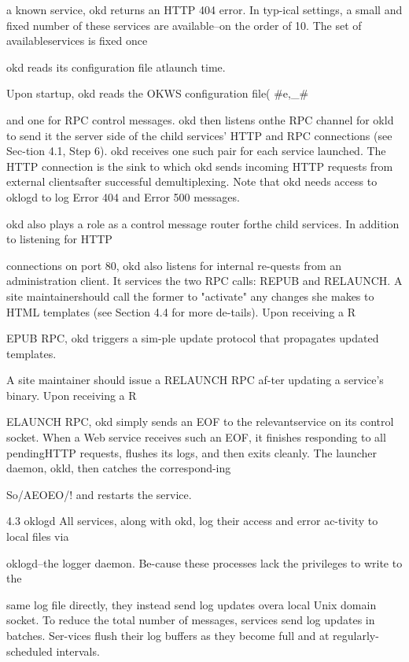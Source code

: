a known service, okd returns an HTTP 404 error. In typ-ical settings, a small and fixed number of these services
are available--on the order of 10. The set of availableservices is fixed once

okd reads its configuration file atlaunch time.

Upon startup, okd reads the OKWS configuration file(
#e,_#%

and one for RPC control messages. okd then listens onthe RPC channel for okld to send it the server side of
the child services' HTTP and RPC connections (see Sec-tion 4.1, Step 6). okd receives one such pair for each service launched. The HTTP connection is the sink to which
okd sends incoming HTTP requests from external clientsafter successful demultiplexing. Note that okd needs access to oklogd to log Error 404 and Error 500 messages.

okd also plays a role as a control message router forthe child services. In addition to listening for HTTP

connections on port 80, okd also listens for internal re-quests from an administration client. It services the two
RPC calls: REPUB and RELAUNCH. A site maintainershould call the former to "activate" any changes she
makes to HTML templates (see Section 4.4 for more de-tails). Upon receiving a R

EPUB RPC, okd triggers a sim-ple update protocol that propagates updated templates.

A site maintainer should issue a RELAUNCH RPC af-ter updating a service's binary. Upon receiving a R

ELAUNCH RPC, okd simply sends an EOF to the relevantservice on its control socket. When a Web service receives such an EOF, it finishes responding to all pendingHTTP requests, flushes its logs, and then exits cleanly.
The launcher daemon, okld, then catches the correspond-ing

So/AEOEO/! and restarts the service.

4.3 oklogd
All services, along with okd, log their access and error ac-tivity to local files via

oklogd--the logger daemon. Be-cause these processes lack the privileges to write to the

same log file directly, they instead send log updates overa local Unix domain socket. To reduce the total number
of messages, services send log updates in batches. Ser-vices flush their log buffers as they become full and at
regularly-scheduled intervals.

